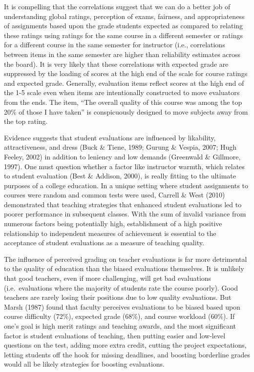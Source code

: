 \documentclass[man]{apa6}
\theoremstyle{definition}
\theoremstyle{definition}
\theoremstyle{definition}
\theoremstyle{remark}
\begin{document}
It is compelling that the correlations suggest that we can do a better
job of understanding global ratings, perception of exams, fairness, and
appropriateness of assignments based upon the grade students expected as
compared to relating these ratings using ratings for the same course in
a different semester or ratings for a different course in the same
semester for instructor (i.e., correlations between items in the same
semester are higher than reliability estimates across the board). It is
very likely that these correlations with expected grade are suppressed
by the loading of scores at the high end of the scale for course ratings
and expected grade. Generally, evaluation items reflect scores at the
high end of the 1-5 scale even when items are intentionally constructed
to move evaluators from the ends. The item, \enquote{The overall quality
of this course was among the top 20\% of those I have taken} is
conspicuously designed to move subjects away from the top rating.

Evidence suggests that student evaluations are influenced by likability,
attractiveness, and dress (Buck \& Tiene, 1989; Gurung \& Vespia, 2007;
Hugh Feeley, 2002) in addition to leniency and low demands (Greenwald \&
Gillmore, 1997). One must question whether a factor like instructor
warmth, which relates to student evaluation (Best \& Addison, 2000), is
really fitting to the ultimate purposes of a college education. In a
unique setting where student assignments to courses were random and
common tests were used, Carrell \& West (2010) demonstrated that
teaching strategies that enhanced student evaluations led to poorer
performance in subsequent classes. With the sum of invalid variance from
numerous factors being potentially high, establishment of a high
positive relationship to independent measures of achievement is
essential to the acceptance of student evaluations as a measure of
teaching quality.

The influence of perceived grading on teacher evaluations is far more
detrimental to the quality of education than the biased evaluations
themselves. It is unlikely that good teachers, even if more challenging,
will get bad evaluations (i.e.~evaluations where the majority of
students rate the course poorly). Good teachers are rarely losing their
positions due to low quality evaluations. But Marsh (1987) found that
faculty perceives evaluations to be biased based upon course difficulty
(72\%), expected grade (68\%), and course workload (60\%). If one's goal
is high merit ratings and teaching awards, and the most significant
factor is student evaluations of teaching, then putting easier and
low-level questions on the test, adding more extra credit, cutting the
project expectations, letting students off the hook for missing
deadlines, and boosting borderline grades would all be likely strategies
for boosting evaluations.
\end{document}
